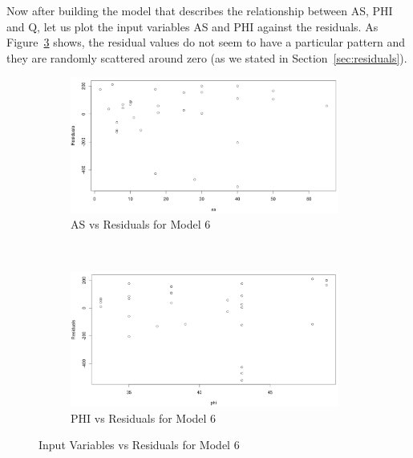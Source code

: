 \documentclass[a4paper,12pt, english]{article}
\begin{document}
Now after building the model that describes the relationship between AS, PHI and Q, let us plot the input variables AS and PHI against the residuals. As Figure~\ref{fig:mod6-resids} shows, the residual values do not seem to have a particular pattern and they are randomly scattered around zero (as we stated in Section~\ref{sec:residuals}).

\begin{figure}[H]
        \centering
        \begin{subfigure}[b]{0.85\textwidth}
                \includegraphics[width=0.96986\textwidth]{mod6-resid1}
   		 \caption{AS vs Residuals for Model 6}
  		\label{fig:mod6-resid1}
        \end{subfigure}%
        ~ %
        
        \begin{subfigure}[b]{0.85\textwidth}
                \centering
  		\includegraphics[width=0.96986\textwidth]{mod6-resid2}
  		\caption{PHI vs Residuals for Model 6}
  		\label{fig:mod6-resid2}
        \end{subfigure}
        
        \caption{Input Variables vs Residuals for Model 6}
        \label{fig:mod6-resids}
\end{figure}
\end{document}
